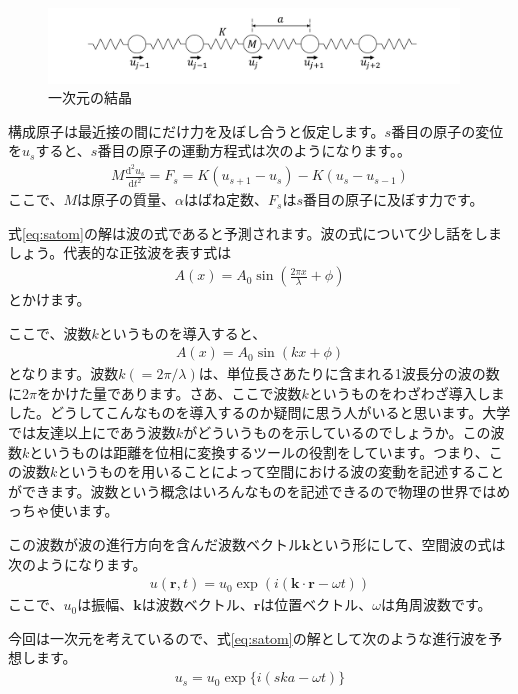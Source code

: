 \documentclass[10pt,b5paper,papersize,dvipdfmx]{jsbook}
\begin{document}
\begin{figure}[htbp]
  \centering
  \includegraphics[height=2cm]{img/bane.pdf}  %
  \caption{一次元の結晶}
  \label{fig:bane}
\end{figure}
構成原子は最近接の間にだけ力を及ぼし合うと仮定します。$s$番目の原子の変位を$u_s$すると、$s$番目の原子の運動方程式は次のようになります。。
\begin{align}
  M\frac{\mathrm{d}^2u_s}{\mathrm{d}t^2} = F_s = K (u_{s+1} - u_s) - K (u_s - u_{s-1})
  \label{eq:satom}
\end{align}
ここで、$M$は原子の質量、$\alpha$はばね定数、$F_s$は$s$番目の原子に及ぼす力です。\par
式\ref{eq:satom}の解は波の式であると予測されます。波の式について少し話をしましょう。代表的な正弦波を表す式は
\begin{align}
  A(x) = A_0 \sin \left(\frac{2\pi x}{\lambda} + \phi \right)
\end{align}
とかけます。\par
ここで、波数$k$というものを導入すると、
\begin{align}
  A(x) = A_0 \sin (kx + \phi)
\end{align}
となります。波数$k (= 2\pi/\lambda)$は、単位長さあたりに含まれる1波長分の波の数に$2\pi$をかけた量であります。さあ、ここで波数$k$というものをわざわざ導入しました。どうしてこんなものを導入するのか疑問に思う人がいると思います。大学では友達以上にであう波数$k$がどういうものを示しているのでしょうか。この波数$k$というものは距離を位相に変換するツールの役割をしています。つまり、この波数$k$というものを用いることによって空間における波の変動を記述することができます。波数という概念はいろんなものを記述できるので物理の世界ではめっちゃ使います。\par
この波数が波の進行方向を含んだ波数ベクトル$\bm{k}$という形にして、空間波の式は次のようになります。
\begin{align}
  u(\bm{r},t) = u_0 \exp(i(\bm{k} \cdot \bm{r} - \omega t))
\end{align}
ここで、$u_0$は振幅、$\bm{k}$は波数ベクトル、$\bm{r}$は位置ベクトル、$\omega$は角周波数です。\par
今回は一次元を考えているので、式\ref{eq:satom}の解として次のような進行波を予想します。
\begin{align}
  u_s = u_0 \exp\{i(ska - \omega t)\}
\end{align}
\end{document}
